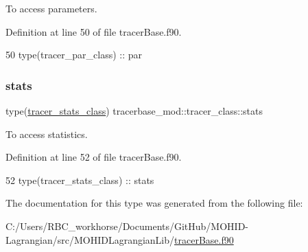 To access parameters. 



Definition at line 50 of file tracer\+Base.\+f90.


\begin{DoxyCode}
50         \textcolor{keywordtype}{type}(tracer\_par\_class)   :: par
\end{DoxyCode}
\mbox{\label{structtracerbase__mod_1_1tracer__class_a161370f3c716daedca72414a3751c56a}} 
\subsubsection{\texorpdfstring{stats}{stats}}
{\footnotesize\ttfamily type(\mbox{\hyperlink{structtracerbase__mod_1_1tracer__stats__class}{tracer\+\_\+stats\+\_\+class}}) tracerbase\+\_\+mod\+::tracer\+\_\+class\+::stats\hspace{0.3cm}{\ttfamily [private]}}



To access statistics. 



Definition at line 52 of file tracer\+Base.\+f90.


\begin{DoxyCode}
52         \textcolor{keywordtype}{type}(tracer\_stats\_class) :: stats
\end{DoxyCode}


The documentation for this type was generated from the following file\+:\begin{DoxyCompactItemize}
\item 
C\+:/\+Users/\+R\+B\+C\+\_\+workhorse/\+Documents/\+Git\+Hub/\+M\+O\+H\+I\+D-\/\+Lagrangian/src/\+M\+O\+H\+I\+D\+Lagrangian\+Lib/\mbox{\hyperlink{tracer_base_8f90}{tracer\+Base.\+f90}}\end{DoxyCompactItemize}
